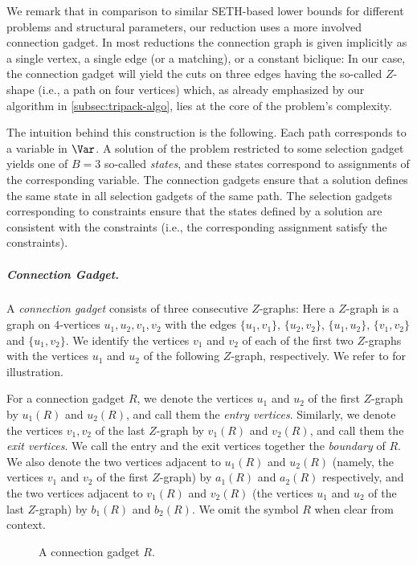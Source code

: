 \documentclass[a4paper,UKenglish,cleveref, autoref, thm-restate]{lipics-v2021}
\begin{document}
We remark that in comparison to similar SETH-based lower bounds for different problems and structural parameters, our reduction uses a more involved connection gadget. 
In most reductions the connection graph is given implicitly as a single vertex, a single edge (or a matching), or a constant biclique:
In our case, the connection gadget will yield the cuts on three edges having the so-called $Z$-shape (i.e., a path on four vertices) which, as already emphasized by our algorithm in \cref{subsec:tripack-algo}, lies at the core of the problem's complexity.

The intuition behind this construction is the following.
Each path corresponds to a variable in $\Var$. 
A solution of the \Tpartp problem restricted to some selection gadget yields one of $B = 3$ so-called \emph{states}, and these states correspond to assignments of the corresponding variable. The connection gadgets ensure that a solution defines the same state in all selection gadgets of the same path. The selection gadgets corresponding to constraints ensure that the states defined by a solution are consistent with the constraints (i.e., the corresponding assignment satisfy the constraints). 

\subparagraph*{Connection Gadget.} A \emph{connection gadget} consists of three consecutive $Z$-graphs: 
Here a $Z$-graph is a graph on $4$-vertices $u_1,u_2,v_1, v_2$ with the edges $\{u_1,v_1\}$, $\{u_2, v_2\}$, $\{u_1, u_2\}$, $\{v_1,v_2\}$ and $\{u_1,v_2\}$. We identify the vertices $v_1$ and $v_2$ of each of the first two $Z$-graphs with the vertices $u_1$ and $u_2$ of the following $Z$-graph, respectively. 
We refer to  for illustration.

For a connection gadget $R$, we denote the vertices $u_1$ and $u_2$ of the first $Z$-graph by $u_1(R)$ and $u_2(R)$, and call them the \emph{entry vertices}.
Similarly, we denote the vertices $v_1, v_2$ of the last $Z$-graph by $v_1(R)$ and $v_2(R)$, and call them the \emph{exit vertices}. We call the entry and the exit vertices together the \emph{boundary} of $R$.
We also denote the two vertices adjacent to $u_1(R)$ and $u_2(R)$ (namely, the vertices $v_1$ and $v_2$ of the first $Z$-graph) by $a_1(R)$ and $a_2(R)$ respectively, and the two vertices adjacent to $v_1(R)$ and $v_2(R)$ (the vertices $u_1$ and $u_2$ of the last $Z$-graph) by $b_1(R)$ and $b_2(R)$.
We omit the symbol $R$ when clear from context.

\begin{figure}[h]
    \centering
{}
\caption{\label{fig:connection-gadget}A connection gadget $R$.}
\end{figure}
\end{document}
